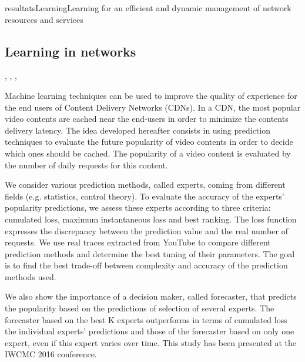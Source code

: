 \documentclass{ra2016}
\begin{document}
\begin{module}{resultats}{Learning}{Learning for an efficient and dynamic management of network resources and services}

\subsection{Learning in networks}
\begin{participants}
,
,
,
\end{participants}

Machine learning techniques can be used to improve the quality of experience for the end users of Content Delivery Networks (CDNs). In a CDN, the most popular video contents are cached near the end-users in order to minimize the contents delivery latency. The idea developed hereafter consists in using prediction techniques to evaluate the future popularity of video contents in order to decide which ones should be cached. The popularity of a video content is evaluated by the number of daily requests for this content.

We consider various prediction methods, called experts, coming from different fields (e.g. statistics, control theory). To evaluate the accuracy of the experts' popularity predictions, we assess these experts according to three criteria: cumulated loss, maximum instantaneous loss and best ranking. The loss function expresses the discrepancy between the prediction value and the real number of requests. We use real traces extracted from YouTube to compare different prediction methods and determine the best tuning of their parameters. The goal is to find the best trade-off between complexity and accuracy of the prediction methods used.

We also show the importance of a decision maker, called forecaster, that predicts the popularity based on the predictions of selection of several experts. The forecaster based on the best K experts outperforms in terms of cumulated loss the individual experts' predictions and those of the forecaster based on only one expert, even if this expert varies over time. This study has been presented at the IWCMC 2016 conference.


\end{module}
\end{document}
